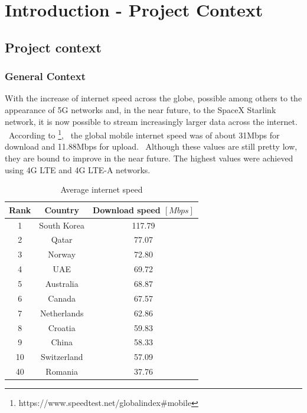 
\chapter{Introduction - Project Context}
\label{ch:introduction}
\pagestyle{headings}

\section{Project context}
\label{sec:introduction-context}

\subsection{General Context}
\label{subsec:introduction-general-context}
With the increase of internet speed across the globe, possible among others to the appearance of 5G networks and, in
the near future, to the SpaceX Starlink network, it is now possible to stream increasingly larger data across the
internet. \
According to \footnote{https://www.speedtest.net/global\-index\#mobile}, \
the global mobile internet speed was of about 31Mbps for download and 11.88Mbps for upload. \
Although these values are still pretty low, they are bound to improve in the near future.
The highest values were achieved using 4G LTE and 4G LTE-A networks.

\begin{table}[ht]
    \caption{Average internet speed}
    \centering
    \begin{tabular}{|c|c|c|}
        \hline\hline
        Rank & Country & Download speed $[Mbps]$ \\
        \hline
        1 & South Korea & 117.79 \\
        2 & Qatar & 77.07  \\
        3 & Norway & 72.80 \\
        4 & UAE & 69.72 \\
        5 & Australia & 68.87 \\
        6 & Canada & 67.57 \\
        7 & Netherlands & 62.86 \\
        8 & Croatia & 59.83 \\
        9 & China & 58.33 \\
        10 & Switzerland & 57.09 \\
        40 & Romania & 37.76
        \hline
    \end{tabular}
    \label{tab:internetspeed}
\end{table}

